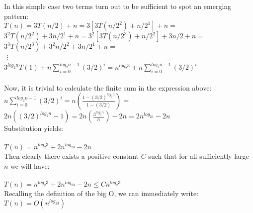 \documentclass[a4paper]{article}
\begin{document}
\begin{itemize}
In this simple case two terms turn out to be sufficient to spot an emerging pattern: \\
$T(n) = 3T(n/2) + n = 3[3T(n/2^2) + n/2^1] + n = $\\
$3^2T(n/2^2) + 3n/2^1 + n = 3^2[3T(n/2^3)+n/2^2] + 3n/2 + n = $\\
$3^3T(n/2^3) + 3^2n/2^2 + 3n/2^1 + n = $ \\
  \vdots \\
$3^{log_2n}T(1) + n\sum \limits_{i=0}^{log_2{n}-1} (3/2)^i =  n^{log_2{3}} + n\sum \limits_{i=0}^{log_2{n}-1} (3/2)^i $ \\
\\
Now, it is trivial to calculate the finite sum in the expression above: \\
$n\sum \limits_{i=0}^{log_2{n}-1} (3/2)^i = n(\frac{1 - (3/2)^{log_2n}}{1 - (3/2)}) = $\\
$2n((3/2)^{log_2n}-1) = 2n(\frac{3^{log_2n}}{n}) - 2n = 2n^{log_23} - 2n$ \\
Substitution yields: \\ \\
$T(n) = n^{log_2{3}} + 2n^{log_23} - 2n$ \\

Then clearly there exists a positive constant $C$ such that for all sufficiently large $n$ we will have: \\
\\
$T(n) = n^{log_2{3}} + 2n^{log_23} - 2n \leq Cn^{log_2{3}}  $
\\
Recalling the definition of the big O, we can immediately write: \\
$T(n) = O(n^{log_23})$


\end{itemize}
\end{document}
